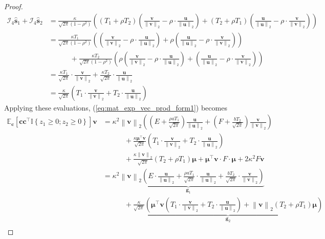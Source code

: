 \documentclass[10pt,a4paper]{amsart}
\def\bfc{{\mathbf{c}}}\def\bfd{{\mathbf{d}}}
\def\bfg{{\mathbf{g}}}\def\bfh{{\mathbf{h}}}
\def\bfs{{\mathbf{s}}}\def\bft{{\mathbf{t}}}
\def\bfu{{\mathbf{u}}}\def\bfv{{\mathbf{v}}}\def\bfw{{\mathbf{w}}}\def\bfx{{\mathbf{x}}}
\def\bfv{{\mathbf{v}}}\def\bfw{{\mathbf{w}}}\def\bfx{{\mathbf{x}}}
\newcommand{\indy}[1]{\mathbb{I}\left\{#1\right\}}
\newcommand{\norm}[1]{\left\|#1\right\|}
\newcommand{\paren}[1]{\left(#1\right)}
\providecommand{\E}{\mathbb{E}}
\begin{document}
\begin{proof}
    \begin{align*}
        \mathcal{I}_4\hat{\bfs}_1 + \mathcal{I}_4\hat{\bfs}_2 & = \frac{\kappa}{\sqrt{2\pi}\paren{1-\rho^2}}\paren{\paren{T_1 + \rho T_2}\paren{\frac{\bfv}{\norm{\bfv}_2} - \rho\cdot\frac{\bfu}{\norm{\bfu}_2}} + \paren{T_2 + \rho T_1}\paren{\frac{\bfu}{\norm{\bfu}_2} - \rho\cdot\frac{\bfv}{\norm{\bfv}_2}}}\\
        & = \frac{\kappa T_1}{\sqrt{2\pi}\paren{1-\rho^2}}\paren{\paren{\frac{\bfv}{\norm{\bfv}_2} - \rho\cdot\frac{\bfu}{\norm{\bfu}_2}} + \rho\paren{\frac{\bfu}{\norm{\bfu}_2} - \rho\cdot\frac{\bfv}{\norm{\bfv}_2}}}\\
        &\quad\quad\quad +\frac{\kappa T_2}{\sqrt{2\pi}\paren{1-\rho^2}}\paren{\rho\paren{\frac{\bfv}{\norm{\bfv}_2} - \rho\cdot\frac{\bfu}{\norm{\bfu}_2}} + \paren{\frac{\bfu}{\norm{\bfu}_2} - \rho\cdot\frac{\bfv}{\norm{\bfv}_2}}}\\
        & = \frac{\kappa T_1}{\sqrt{2\pi}}\cdot\frac{\bfv}{\norm{\bfv}_2} + \frac{\kappa T_2}{\sqrt{2\pi}}\cdot\frac{\bfu}{\norm{\bfu}_2}\\
        & = \frac{\kappa}{\sqrt{2\pi}}\paren{T_1\cdot \frac{\bfv}{\norm{\bfv}_2} + T_2\cdot \frac{\bfu}{\norm{\bfu}_2}}
    \end{align*}
    Applying these evaluations, (\ref{eq:mat_exp_vec_prod_form1}) becomes
    \begin{equation}
        \label{eq:mat_exp_vec_prod_form2}
        \begin{aligned}
            \E_{\bfc}\left[\bfc\bfc^\top\indy{z_1\geq 0;z_2\geq 0}\right]\bfv & = \kappa^2\norm{\bfv}_2\paren{\paren{E + \frac{\rho a T_1}{\sqrt{2\pi}}}\frac{\bfu}{\norm{\bfu}_2} + \paren{F + \frac{b T_2}{\sqrt{2\pi}}}\frac{\bfv}{\norm{\bfv}_2}}\\
            &\quad\quad\quad + \frac{\kappa\bm{\mu}^\top\bfv}{\sqrt{2\pi}}\paren{T_1\cdot \frac{\bfv}{\norm{\bfv}_2} + T_2\cdot \frac{\bfu}{\norm{\bfu}_2}}\\
            &\quad\quad\quad + \frac{\kappa\norm{\bfv}_2}{\sqrt{2\pi}}\paren{T_2 + \rho T_1}\bm{\mu} + \bm{\mu}^\top\bfv\cdot F\cdot \bm{\mu} + 2\kappa^2F\bfv\\
            & = \underbrace{\kappa^2\norm{\bfv}_2\paren{E\cdot \frac{\bfu}{\norm{\bfu}_2} + \frac{\rho a T_1}{\sqrt{2\pi}}\cdot \frac{\bfu}{\norm{\bfu}_2} + \frac{b T_2}{\sqrt{2\pi}}\cdot \frac{\bfv}{\norm{\bfv}_2}}}_{\bfg_1}\\
            & \quad\quad\quad + \underbrace{\frac{\kappa}{\sqrt{2\pi}}\paren{\bm{\mu}^\top\bfv\paren{T_1\cdot \frac{\bfv}{\norm{\bfv}_2} + T_2\cdot \frac{\bfu}{\norm{\bfu}_2}} + \norm{\bfv}_2\paren{T_2 + \rho T_1}\bm{\mu}}}_{\bfg_2}\\

\end{aligned}
\end{equation}
\end{proof}
\end{document}
